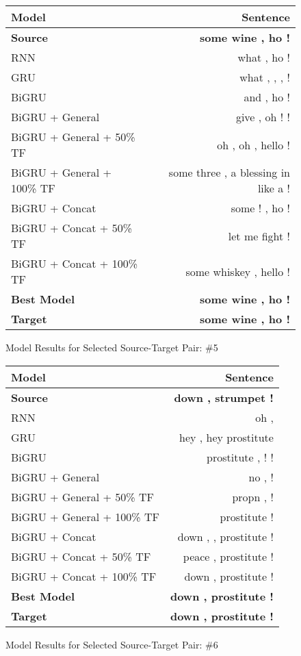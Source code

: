 \documentclass[twoside,twocolumn]{article}
\newlength\mystoreparindent
\newenvironment{myparindent}[1]{%
  \setlength{\mystoreparindent}{\the\parindent}
  \setlength{\parindent}{#1}
  }{%
  \setlength{\parindent}{\mystoreparindent}
}
\begin{document}
\begin{myparindent}{0pt}
\begin{figure}[ht!]
    \centering
    \begin{tabular}{ |l|r| }
        \hline
        \textbf{Model}
          & \textbf{Sentence} \\
        \hline
        \textbf{Source} & \textbf{some wine , ho !} \\ \hline
        RNN & what , ho ! \\ \hline
        GRU & what , , , ! \\ \hline
        BiGRU & and , ho ! \\ \hline
        BiGRU + General & give , oh ! ! \\ \hline
        BiGRU + General + 50\% TF & oh , oh , hello ! \\ \hline
        BiGRU + General + 100\% TF & some three , a blessing in like a ! \\ \hline
        BiGRU + Concat & some ! , ho ! \\ \hline
        BiGRU + Concat + 50\% TF & let me fight ! \\ \hline
        BiGRU + Concat + 100\% TF & some whiskey , hello ! \\ \hline
        \textbf{Best Model} & \textbf{some wine , ho !} \\ \hline
        \textbf{Target} & \textbf{some wine , ho !} \\ \hline
    \end{tabular}
    \caption{Model Results for Selected Source-Target Pair: \#5}
    \label{fig:model-results-5}
\end{figure}

\begin{figure}[ht!]
    \centering
    \begin{tabular}{ |l|r| }
        \hline
        \textbf{Model}
          & \textbf{Sentence} \\
        \hline
        \textbf{Source} & \textbf{down , strumpet !} \\ \hline
        RNN & oh , \\ \hline
        GRU & hey , hey prostitute \\ \hline
        BiGRU & prostitute , ! ! \\ \hline
        BiGRU + General & no , ! \\ \hline
        BiGRU + General + 50\% TF & propn , ! \\ \hline
        BiGRU + General + 100\% TF & prostitute ! \\ \hline
        BiGRU + Concat & down , , prostitute ! \\ \hline
        BiGRU + Concat + 50\% TF & peace , prostitute ! \\ \hline
        BiGRU + Concat + 100\% TF & down , prostitute ! \\ \hline
        \textbf{Best Model} & \textbf{down , prostitute !} \\ \hline
        \textbf{Target} & \textbf{down , prostitute !} \\ \hline
    \end{tabular}
    \caption{Model Results for Selected Source-Target Pair: \#6}
    \label{fig:model-results-6}
\end{figure}


\end{myparindent}
\end{document}
